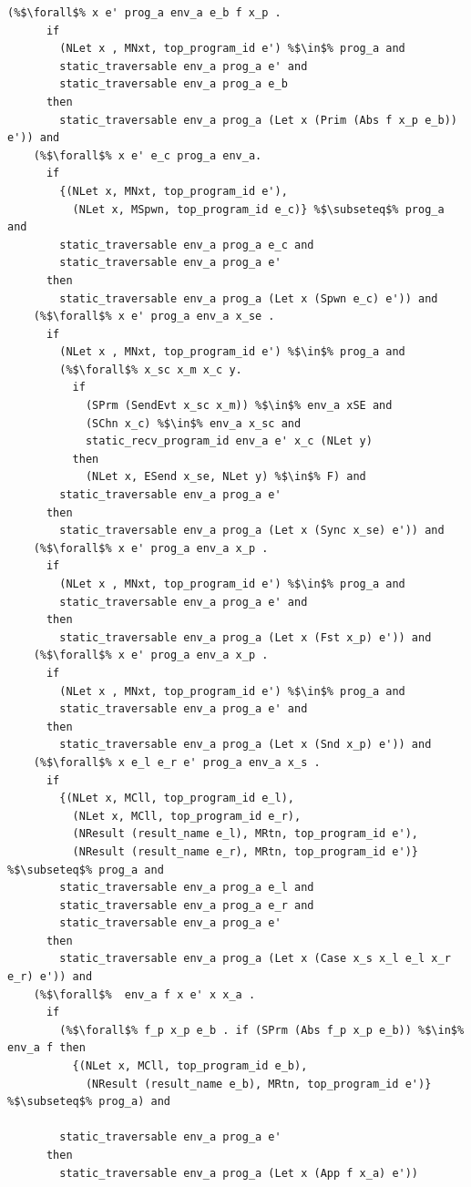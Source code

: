 \documentclass{article}
\begin{document}
\begin{lstlisting}[language=logic, escapechar=\%]
    (%$\forall$% x e' prog_a env_a e_b f x_p .
      if
        (NLet x , MNxt, top_program_id e') %$\in$% prog_a and
        static_traversable env_a prog_a e' and
        static_traversable env_a prog_a e_b
      then
        static_traversable env_a prog_a (Let x (Prim (Abs f x_p e_b)) e')) and
    (%$\forall$% x e' e_c prog_a env_a.
      if
        {(NLet x, MNxt, top_program_id e'),
          (NLet x, MSpwn, top_program_id e_c)} %$\subseteq$% prog_a and
        static_traversable env_a prog_a e_c and
        static_traversable env_a prog_a e'
      then
        static_traversable env_a prog_a (Let x (Spwn e_c) e')) and
    (%$\forall$% x e' prog_a env_a x_se .
      if
        (NLet x , MNxt, top_program_id e') %$\in$% prog_a and
        (%$\forall$% x_sc x_m x_c y.
          if
            (SPrm (SendEvt x_sc x_m)) %$\in$% env_a xSE and 
            (SChn x_c) %$\in$% env_a x_sc and
            static_recv_program_id env_a e' x_c (NLet y)
          then
            (NLet x, ESend x_se, NLet y) %$\in$% F) and
        static_traversable env_a prog_a e'
      then
        static_traversable env_a prog_a (Let x (Sync x_se) e')) and
    (%$\forall$% x e' prog_a env_a x_p .
      if
        (NLet x , MNxt, top_program_id e') %$\in$% prog_a and
        static_traversable env_a prog_a e' and
      then
        static_traversable env_a prog_a (Let x (Fst x_p) e')) and
    (%$\forall$% x e' prog_a env_a x_p .
      if
        (NLet x , MNxt, top_program_id e') %$\in$% prog_a and
        static_traversable env_a prog_a e' and
      then
        static_traversable env_a prog_a (Let x (Snd x_p) e')) and
    (%$\forall$% x e_l e_r e' prog_a env_a x_s .
      if
        {(NLet x, MCll, top_program_id e_l),
          (NLet x, MCll, top_program_id e_r),
          (NResult (result_name e_l), MRtn, top_program_id e'),
          (NResult (result_name e_r), MRtn, top_program_id e')} %$\subseteq$% prog_a and
        static_traversable env_a prog_a e_l and
        static_traversable env_a prog_a e_r and
        static_traversable env_a prog_a e'
      then
        static_traversable env_a prog_a (Let x (Case x_s x_l e_l x_r e_r) e')) and
    (%$\forall$%  env_a f x e' x x_a .
      if
        (%$\forall$% f_p x_p e_b . if (SPrm (Abs f_p x_p e_b)) %$\in$% env_a f then 
          {(NLet x, MCll, top_program_id e_b),
            (NResult (result_name e_b), MRtn, top_program_id e')} %$\subseteq$% prog_a) and

        static_traversable env_a prog_a e'
      then
        static_traversable env_a prog_a (Let x (App f x_a) e'))
  \end{lstlisting}
\end{document}
